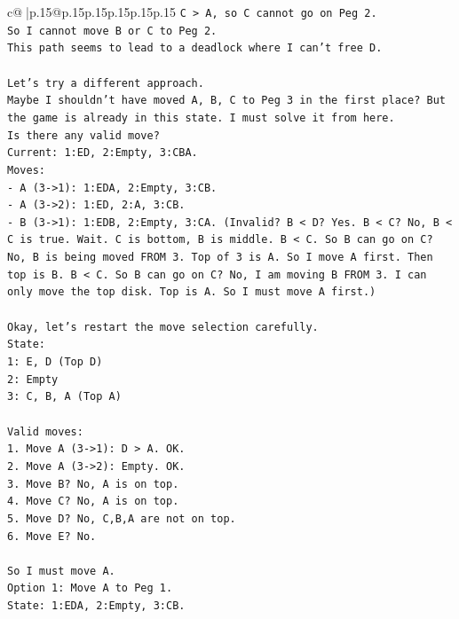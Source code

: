 \documentclass{article}
\begin{document}
{\begin{supertabular}{c@{$\;$}|p{.15\linewidth}@{}p{.15\linewidth}p{.15\linewidth}p{.15\linewidth}p{.15\linewidth}p{.15\linewidth}}
{{{\texttt{C > A, so C cannot go on Peg 2.} \\
\texttt{So I cannot move B or C to Peg 2.} \\
\texttt{This path seems to lead to a deadlock where I can't free D.} \\
\\ 
\texttt{Let's try a different approach.} \\
\texttt{Maybe I shouldn't have moved A, B, C to Peg 3 in the first place? But the game is already in this state. I must solve it from here.} \\
\texttt{Is there any valid move?} \\
\texttt{Current: 1:ED, 2:Empty, 3:CBA.} \\
\texttt{Moves:} \\
\texttt{{-} A (3{-}>1): 1:EDA, 2:Empty, 3:CB.} \\
\texttt{{-} A (3{-}>2): 1:ED, 2:A, 3:CB.} \\
\texttt{{-} B (3{-}>1): 1:EDB, 2:Empty, 3:CA. (Invalid? B < D? Yes. B < C? No, B < C is true. Wait. C is bottom, B is middle. B < C. So B can go on C? No, B is being moved FROM 3. Top of 3 is A. So I move A first. Then top is B. B < C. So B can go on C? No, I am moving B FROM 3. I can only move the top disk. Top is A. So I must move A first.)} \\
\\ 
\texttt{Okay, let's restart the move selection carefully.} \\
\texttt{State:} \\
\texttt{1: E, D (Top D)} \\
\texttt{2: Empty} \\
\texttt{3: C, B, A (Top A)} \\
\\ 
\texttt{Valid moves:} \\
\texttt{1. Move A (3{-}>1): D > A. OK.} \\
\texttt{2. Move A (3{-}>2): Empty. OK.} \\
\texttt{3. Move B? No, A is on top.} \\
\texttt{4. Move C? No, A is on top.} \\
\texttt{5. Move D? No, C,B,A are not on top.} \\
\texttt{6. Move E? No.} \\
\\ 
\texttt{So I must move A.} \\
\texttt{Option 1: Move A to Peg 1.} \\
\texttt{State: 1:EDA, 2:Empty, 3:CB.} \\
}}}
\end{supertabular}}
\end{document}
